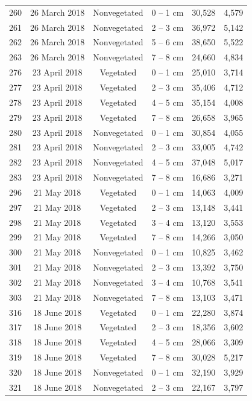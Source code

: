 \documentclass[12pt,]{article}
\begin{document}
\begin{longtable}[t]{cccccc}
260 & 26 March 2018 & Nonvegetated & 0 – 1 cm & 30,528 & 4,579\\
261 & 26 March 2018 & Nonvegetated & 2 – 3 cm & 36,972 & 5,142\\
262 & 26 March 2018 & Nonvegetated & 5 – 6 cm & 38,650 & 5,522\\
263 & 26 March 2018 & Nonvegetated & 7 – 8 cm & 24,660 & 4,834\\
276 & 23 April 2018 & Vegetated & 0 – 1 cm & 25,010 & 3,714\\
277 & 23 April 2018 & Vegetated & 2 – 3 cm & 35,406 & 4,712\\
278 & 23 April 2018 & Vegetated & 4 – 5 cm & 35,154 & 4,008\\
279 & 23 April 2018 & Vegetated & 7 – 8 cm & 26,658 & 3,965\\
280 & 23 April 2018 & Nonvegetated & 0 – 1 cm & 30,854 & 4,055\\
281 & 23 April 2018 & Nonvegetated & 2 – 3 cm & 33,005 & 4,742\\
282 & 23 April 2018 & Nonvegetated & 4 – 5 cm & 37,048 & 5,017\\
283 & 23 April 2018 & Nonvegetated & 7 – 8 cm & 16,686 & 3,271\\
296 & 21 May 2018 & Vegetated & 0 – 1 cm & 14,063 & 4,009\\
297 & 21 May 2018 & Vegetated & 2 – 3 cm & 13,148 & 3,441\\
298 & 21 May 2018 & Vegetated & 3 – 4 cm & 13,120 & 3,553\\
299 & 21 May 2018 & Vegetated & 7 – 8 cm & 14,266 & 3,050\\
300 & 21 May 2018 & Nonvegetated & 0 – 1 cm & 10,825 & 3,462\\
301 & 21 May 2018 & Nonvegetated & 2 – 3 cm & 13,392 & 3,750\\
302 & 21 May 2018 & Nonvegetated & 3 – 4 cm & 10,768 & 3,541\\
303 & 21 May 2018 & Nonvegetated & 7 – 8 cm & 13,103 & 3,471\\
316 & 18 June 2018 & Vegetated & 0 – 1 cm & 22,280 & 3,874\\
317 & 18 June 2018 & Vegetated & 2 – 3 cm & 18,356 & 3,602\\
318 & 18 June 2018 & Vegetated & 4 – 5 cm & 28,066 & 3,309\\
319 & 18 June 2018 & Vegetated & 7 – 8 cm & 30,028 & 5,217\\
320 & 18 June 2018 & Nonvegetated & 0 – 1 cm & 32,190 & 3,929\\
321 & 18 June 2018 & Nonvegetated & 2 – 3 cm & 22,167 & 3,797\\

\end{longtable}
\end{document}
